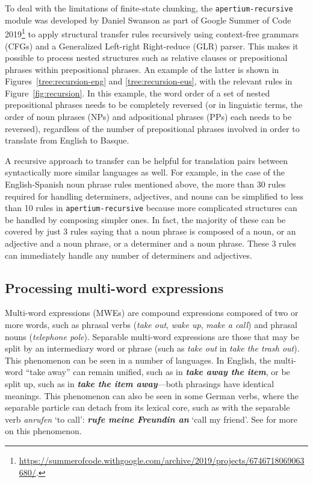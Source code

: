 \documentclass[free]{flammie}
\begin{document}
To deal with the limitations of finite-state chunking, the
\texttt{apertium-recursive} module \cite{swanson2020tree} was developed by
Daniel Swanson as part of Google Summer of Code
2019\footnote{\url{https://summerofcode.withgoogle.com/archive/2019/projects/6746718069063680/}.}
to apply structural transfer rules recursively using context-free grammars
(CFGs) and a Generalized Left-right Right-reduce (GLR) parser. This makes it
possible to process nested structures such as relative clauses or prepositional
phrases within prepositional phrases. An example of the latter is shown in
Figures~\ref{tree:recursion-eng} and \ref{tree:recursion-eus}, with the relevant
rules in Figure~\ref{fig:recursion}.  In this example, the word order of a set
of nested prepositional phrases needs to be completely reversed (or in
linguistic terms, the order of noun phrases (NPs) and adpositional phrases (PPs)
each needs to be reversed), regardless of the number of prepositional phrases
involved in order to translate from English to Basque.

A recursive approach to transfer can be helpful for translation pairs between
syntactically more similar languages as well. For example, in the case of the
English-Spanish noun phrase rules mentioned above, the more than 30 rules
required for handling determiners, adjectives, and nouns can be simplified to
less than 10 rules in \texttt{apertium-recursive} because more complicated
structures can be handled by composing simpler ones. In fact, the majority of
these can be covered by just 3 rules saying that a noun phrase is composed of a
noun, or an adjective and a noun phrase, or a determiner and a noun phrase.
These 3 rules can immediately handle any number of determiners and adjectives.

\subsection{Processing multi-word expressions}\label{sec:ApertiumSeparable}

Multi-word expressions (MWEs) are compound expressions composed of two or more
words, such as phrasal verbs (\emph{take out}, \emph{wake up}, \emph{make a
call}) and phrasal nouns (\emph{telephone pole}). Separable multi-word
expressions are those that may be split by an intermediary word or phrase (such
as \emph{take out} in \emph{take the trash out}). This phenomenon can be seen in
a number of languages. In English, the multi-word ``take away'' can remain
unified, such as in \emph{\textbf{take away the item}}, or be split up, such as
in \emph{\textbf{take the item away}}---both phrasings have identical meanings.
This phenomenon can also be seen in some German verbs, where the separable
particle can detach from its lexical core, such as with the separable verb
\emph{anrufen} `to call': \emph{\textbf{rufe meine Freundin an}} `call my
friend'. See \cite{constant2017multiword} for more on this phenomenon.
\end{document}
